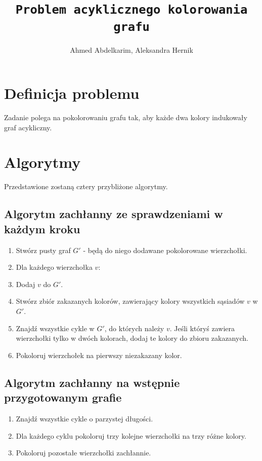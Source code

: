 \documentclass{article}
\title{\texttt{Problem acyklicznego kolorowania grafu}}
\author{Ahmed Abdelkarim, Aleksandra Hernik}
\begin{document}
\maketitle
\section{Definicja problemu}
Zadanie polega na pokolorowaniu grafu tak, aby każde dwa kolory indukowały graf acykliczny. 
\section{Algorytmy}
Przedstawione zostaną cztery przybliżone algorytmy.
\subsection{Algorytm zachłanny ze sprawdzeniami w każdym kroku}
\begin{enumerate}
\item Stwórz pusty graf $G'$ - będą do niego dodawane pokolorowane wierzchołki.
\item Dla każdego wierzchołka $v$:
\item Dodaj $v$ do $G'$.
\item Stwórz zbiór zakazanych kolorów, zawierający kolory wszystkich sąsiadów $v$ w $G'$.
\item Znajdź wszystkie cykle w $G'$, do których należy $v$. Jeśli któryś zawiera wierzchołki tylko w dwóch kolorach, dodaj te kolory do zbioru zakazanych.
\item Pokoloruj wierzchołek na pierwszy niezakazany kolor.
  
\end{enumerate}
\subsection{Algorytm zachłanny na wstępnie przygotowanym grafie}
\begin{enumerate}
\item Znajdź wszystkie cykle o parzystej długości.
\item Dla każdego cyklu pokoloruj trzy kolejne wierzchołki na trzy różne kolory.
\item Pokoloruj pozostałe wierzchołki zachłannie.
\end{enumerate}
\end{document}

